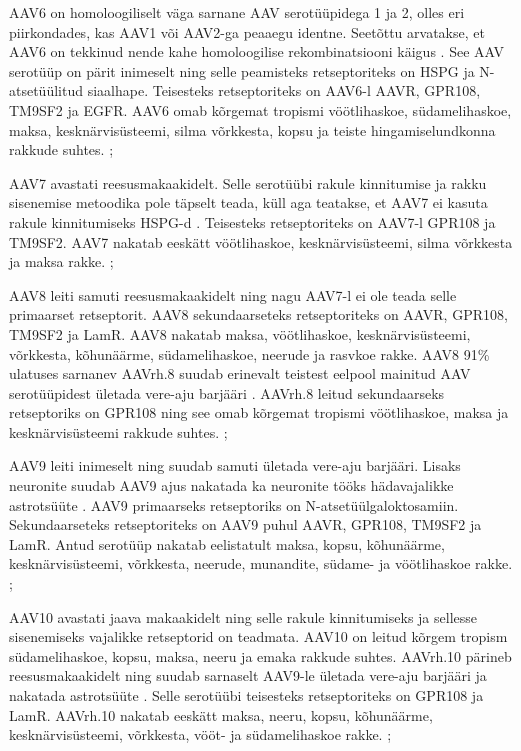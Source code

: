 \documentclass{trkut}%
\begin{document}
AAV6 on homoloogiliselt väga sarnane AAV serotüüpidega 1 ja 2, olles eri piirkondades, kas AAV1 või AAV2-ga peaaegu identne. Seetõttu arvatakse, et AAV6 on tekkinud nende kahe homoloogilise rekombinatsiooni käigus \parencite{aav6}. See AAV serotüüp on pärit inimeselt ning selle peamisteks retseptoriteks on HSPG ja N-atsetüülitud siaalhape. Teisesteks retseptoriteks on AAV6-l AAVR, GPR108, TM9SF2 ja EGFR. AAV6 omab kõrgemat tropismi vöötlihaskoe, südamelihaskoe, maksa, kesknärvisüsteemi, silma võrkkesta, kopsu ja teiste hingamiselundkonna rakkude suhtes. \parencite{pupo}; \parencite{serotüübid}

AAV7 avastati reesusmakaakidelt. Selle serotüübi rakule kinnitumise ja rakku sisenemise metoodika pole täpselt teada, küll aga teatakse, et AAV7 ei kasuta rakule kinnitumiseks HSPG-d \parencite{glykaanid}. Teisesteks retseptoriteks on AAV7-l GPR108 ja TM9SF2. AAV7 nakatab eeskätt vöötlihaskoe, kesknärvisüsteemi, silma võrkkesta ja maksa rakke. \parencite{pupo}; \parencite{serotüübid}

AAV8 leiti samuti reesusmakaakidelt ning nagu AAV7-l ei ole teada selle primaarset retseptorit. AAV8 sekundaarseteks retseptoriteks on AAVR, GPR108, TM9SF2 ja LamR. AAV8 nakatab maksa, vöötlihaskoe, kesknärvisüsteemi, võrkkesta, kõhunäärme, südamelihaskoe, neerude ja rasvkoe rakke. AAV8 91\% ulatuses sarnanev AAVrh.8 suudab erinevalt teistest eelpool mainitud AAV serotüüpidest ületada vere-aju barjääri \parencite{AAVrh.8}. AAVrh.8 leitud sekundaarseks retseptoriks on GPR108 ning see omab kõrgemat tropismi vöötlihaskoe, maksa ja kesknärvisüsteemi rakkude suhtes. \parencite{pupo}; \parencite{serotüübid}

AAV9 leiti inimeselt ning suudab samuti ületada vere-aju barjääri. Lisaks neuronite suudab AAV9 ajus nakatada ka neuronite tööks hädavajalikke astrotsüüte \parencite{bbb}. AAV9 primaarseks retseptoriks on N-atsetüülgaloktosamiin. Sekundaarseteks retseptoriteks on AAV9 puhul AAVR, GPR108, TM9SF2 ja LamR. Antud serotüüp nakatab eelistatult maksa, kopsu, kõhunäärme, kesknärvisüsteemi, võrkkesta, neerude, munandite, südame- ja vöötlihaskoe rakke. \parencite{pupo}; \parencite{serotüübid}

AAV10 avastati jaava makaakidelt ning selle rakule kinnitumiseks ja sellesse sisenemiseks vajalikke retseptorid on teadmata. AAV10 on leitud kõrgem tropism südamelihaskoe, kopsu, maksa, neeru ja emaka rakkude suhtes. AAVrh.10 pärineb reesusmakaakidelt ning suudab sarnaselt AAV9-le ületada vere-aju barjääri ja nakatada astrotsüüte \parencite{bbb}. Selle serotüübi teisesteks retseptoriteks on GPR108 ja LamR. AAVrh.10 nakatab eeskätt maksa, neeru, kopsu, kõhunäärme, kesknärvisüsteemi, võrkkesta, vööt- ja südamelihaskoe rakke. \parencite{pupo}; \parencite{serotüübid}
\end{document}
